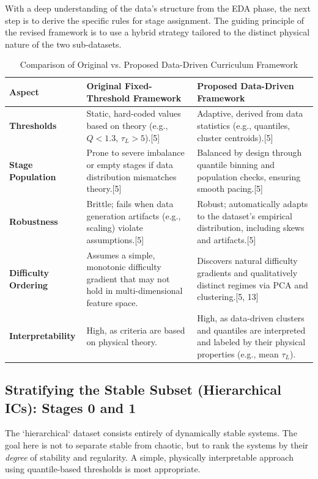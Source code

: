 \documentclass[11pt, letterpaper]{article}
\begin{document}
With a deep understanding of the data's structure from the EDA phase, the next step is to derive the specific rules for stage assignment. The guiding principle of the revised framework is to use a hybrid strategy tailored to the distinct physical nature of the two sub-datasets.

\begin{table}[H]
\centering
\caption{Comparison of Original vs. Proposed Data-Driven Curriculum Framework}
\label{tab:framework_comparison}
\begin{tabular}{@{}p{2.5cm}p{5.5cm}p{5.5cm}@{}}
\toprule
\textbf{Aspect} & \textbf{Original Fixed-Threshold Framework} & \textbf{Proposed Data-Driven Framework} \\ \midrule
\textbf{Thresholds} & Static, hard-coded values based on theory (e.g., $Q<1.3$, $\tau_L>5$).[5] & Adaptive, derived from data statistics (e.g., quantiles, cluster centroids).[5] \\
\textbf{Stage Population} & Prone to severe imbalance or empty stages if data distribution mismatches theory.[5] & Balanced by design through quantile binning and population checks, ensuring smooth pacing.[5] \\
\textbf{Robustness} & Brittle; fails when data generation artifacts (e.g., scaling) violate assumptions.[5] & Robust; automatically adapts to the dataset's empirical distribution, including skews and artifacts.[5] \\
\textbf{Difficulty Ordering} & Assumes a simple, monotonic difficulty gradient that may not hold in multi-dimensional feature space. & Discovers natural difficulty gradients and qualitatively distinct regimes via PCA and clustering.[5, 13] \\
\textbf{Interpretability} & High, as criteria are based on physical theory. & High, as data-driven clusters and quantiles are interpreted and labeled by their physical properties (e.g., mean $\tau_L$). \\ \bottomrule
\end{tabular}
\end{table}

\subsection{Stratifying the Stable Subset (Hierarchical ICs): Stages 0 and 1}

The `hierarchical` dataset consists entirely of dynamically stable systems. The goal here is not to separate stable from chaotic, but to rank the systems by their \textit{degree} of stability and regularity. A simple, physically interpretable approach using quantile-based thresholds is most appropriate.
\end{document}
